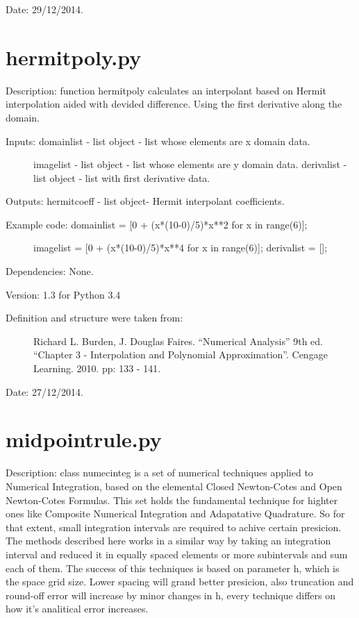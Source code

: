 \documentclass[letterpaper,10pt,oneside]{sphinxmanual}
\theoremstyle{plain}%
\theoremstyle{definition}%
\theoremstyle{remark}%
\begin{document}
Date: 29/12/2014.


\section{hermitpoly.py}
\label{code:hermitpoly-py}\label{code:module-hermitpoly}
Description: function hermitpoly calculates an interpolant based on Hermit
interpolation aided with devided difference. Using the first derivative 
along the domain.
\begin{description}
\item[{Inputs: domainlist - list object - list whose elements are x domain data.}] \leavevmode
imagelist - list object - list whose elements are y domain data.
derivalist - list object - list with first derivative data.

\end{description}

Outputs: hermitcoeff - list object- Hermit interpolant coefficients.
\begin{description}
\item[{Example code: domainlist = {[}0 + (x*(10-0)/5)*x**2 for x in range(6){]};}] \leavevmode
imagelist = {[}0 + (x*(10-0)/5)*x**4 for x in range(6){]};
derivalist = {[}{]};

\end{description}

Dependencies: None.

Version: 1.3 for Python 3.4
\begin{description}
\item[{Definition and structure were taken from:}] \leavevmode
Richard L. Burden, J. Douglas Faires. ``Numerical Analysis'' 9th ed.
``Chapter 3 - Interpolation and Polynomial Approximation''. 
Cengage Learning. 2010. pp: 133 - 141.

\end{description}




Date: 27/12/2014.


\section{midpointrule.py}
\label{code:module-midpointrule}\label{code:midpointrule-py}
Description: class numecinteg is a set of numerical techniques applied to
Numerical Integration, based on the elemental Closed Newton-Cotes and
Open Newton-Cotes Formulas. This set holds the fundamental technique for
highter ones like Composite Numerical Integration and Adapatative Quadrature.
So for that extent, small integration intervals are required to achive certain
presicion. The methods described here works in a similar way by taking an
integration interval and reduced it in equally spaced elements or more 
subintervals and sum each of them. The success of this techniques is based
on parameter h, which is the space grid size. Lower spacing will grand better
presicion, also truncation and round-off error will increase by minor changes
in h, every technique differs on how it's analitical error increases.
\end{document}
